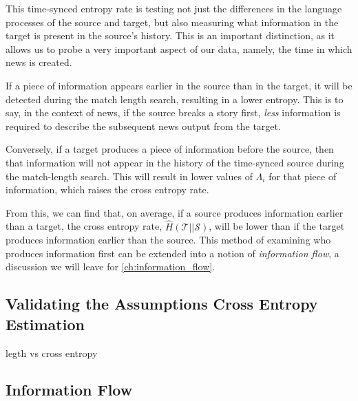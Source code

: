 This time-synced entropy rate is testing not just the differences in the language processes of the source and target, but also measuring what information in the target is present in the source's history. This is an important distinction, as it allows us to probe a very important aspect of our data, namely, the time in which news is created. 

If a piece of information appears earlier in the source than in the target, it will be detected during the match length search, resulting in a lower entropy. This is to say, in the context of news, if the {\color{source}source} breaks a story first, \emph{less} information is required to describe the subsequent news output from the {\color{target}target}. 

Conversely, if a {\color{target}target} produces a piece of information before the {\color{source}source}, then that information will not appear in the history of the time-synced source during the match-length search. This will result in lower values of $\Lambda_i$ for that piece of information, which raises the cross entropy rate.

From this, we can find that, on average, if a {\color{source}source} produces information earlier than a {\color{target}target}, the cross entropy rate, $\hat{H}(\mathcal{T} || \mathcal{S})$, will be lower than if the {\color{target}target} produces information earlier than the {\color{source}source}. This method of examining who produces information first can be extended into a notion of \emph{information flow}, a discussion we will leave for \autoref{ch:information_flow}.



\subsection{Validating the Assumptions Cross Entropy Estimation}
legth vs cross entropy




\subsection{Information Flow}\label{ch:information_flow}


